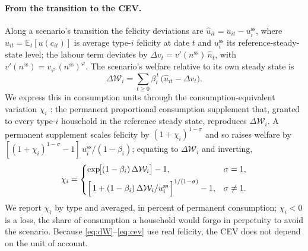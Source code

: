 \paragraph{From the transition to the CEV.} Along a scenario's transition the
felicity deviations are $\widehat{u}_{it}=u_{it}-u^{\mathrm{ss}}_i$, where
$u_{it}=\mathbb{E}_t[u(c_{it})]$ is average type-$i$ felicity at date $t$ and
$u^{\mathrm{ss}}_i$ its reference-steady-state level; the labour term deviates by
$\Delta v_t=v'(n^{\mathrm{ss}})\,\widehat{n}_t$, with
$v'(n^{\mathrm{ss}})=v_\varphi\,(n^{\mathrm{ss}})^{\varphi}$. The scenario's welfare
relative to its own steady state is
%
\begin{equation}
  \Delta\mathcal{W}_i=\sum_{t\ge0}\beta_i^{\,t}\,\bigl(\widehat{u}_{it}-\Delta v_t\bigr).
  \label{eq:dW}
\end{equation}
%
We express this in consumption units through the consumption-equivalent variation
$\chi_i$ \citep{Lucas1987}: the permanent proportional consumption supplement that,
granted to every type-$i$ household in the reference steady state, reproduces
$\Delta\mathcal{W}_i$. A permanent supplement scales felicity by
$(1+\chi_i)^{1-\sigma}$ and so raises welfare by
$[(1+\chi_i)^{1-\sigma}-1]\,u^{\mathrm{ss}}_i/(1-\beta_i)$; equating to
$\Delta\mathcal{W}_i$ and inverting,
%
\begin{equation}
  \chi_i=
  \begin{cases}
    \exp\!\bigl[(1-\beta_i)\,\Delta\mathcal{W}_i\bigr]-1, & \sigma=1,\\[4pt]
    \Bigl[\,1+(1-\beta_i)\,\Delta\mathcal{W}_i/u^{\mathrm{ss}}_i\,\Bigr]^{1/(1-\sigma)}-1, & \sigma\neq1.
  \end{cases}
  \label{eq:cev}
\end{equation}
%
We report $\chi_i$ by type and averaged, in percent of permanent consumption;
$\chi_i<0$ is a loss, the share of consumption a household would forgo in perpetuity
to avoid the scenario. Because \eqref{eq:dW}--\eqref{eq:cev} use real felicity, the
CEV does not depend on the unit of account.

